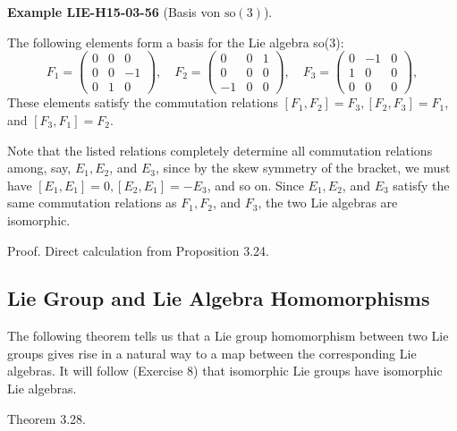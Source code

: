 \documentclass[10pt, letterpaper]{article}
\newcommand{\CustomHeading}[3]{%
  \par\medskip\noindent%
  \textbf{#1 #2} \textnormal{(#3)}.\enskip%
}
\newenvironment{EXA}[2]{\begin{unitbox}\CustomHeading{Example}{#1}{#2}}{\end{unitbox}}
\begin{document}
\begin{EXA}{LIE-H15-03-56}{Basis von $\mathrm{so}(3)$}
The following elements form a basis for the Lie algebra so(3):
$$
F_{1}=\left(\begin{array}{rrr}
0 & 0 & 0 \\
0 & 0 & -1 \\
0 & 1 & 0
\end{array}\right), \quad F_{2}=\left(\begin{array}{rrr}
0 & 0 & 1 \\
0 & 0 & 0 \\
-1 & 0 & 0
\end{array}\right), \quad F_{3}=\left(\begin{array}{rrr}
0 & -1 & 0 \\
1 & 0 & 0 \\
0 & 0 & 0
\end{array}\right),
$$
These elements satisfy the commutation relations $\left[F_{1}, F_{2}\right]=F_{3},\left[F_{2}, F_{3}\right]=F_{1}$, and $\left[F_{3}, F_{1}\right]=F_{2}$.
\end{EXA}

Note that the listed relations completely determine all commutation relations among, say, $E_{1}, E_{2}$, and $E_{3}$, since by the skew symmetry of the bracket, we must have $\left[E_{1}, E_{1}\right]=0,\left[E_{2}, E_{1}\right]=-E_{3}$, and so on. Since $E_{1}, E_{2}$, and $E_{3}$ satisfy the same commutation relations as $F_{1}, F_{2}$, and $F_{3}$, the two Lie algebras are isomorphic.

Proof. Direct calculation from Proposition 3.24.

\subsection*{Lie Group and Lie Algebra Homomorphisms}
The following theorem tells us that a Lie group homomorphism between two Lie groups gives rise in a natural way to a map between the corresponding Lie algebras. It will follow (Exercise 8) that isomorphic Lie groups have isomorphic Lie algebras.

Theorem 3.28. 
\end{document}
